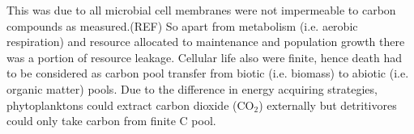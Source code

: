 \documentclass[../thesis.tex]{subfiles} %
\begin{document}
This was due to all microbial cell membranes were not impermeable to carbon compounds as measured.(REF)  So apart from metabolism (i.e. aerobic respiration) and resource allocated to maintenance and population growth there was a portion of resource leakage.  Cellular life also were finite, hence death had to be considered as carbon pool transfer from biotic (i.e. biomass) to abiotic (i.e. organic matter) pools.  Due to the difference in energy acquiring strategies, phytoplanktons could extract carbon dioxide (CO$_2$) externally but detritivores could only take carbon from finite C pool.
\end{document}

